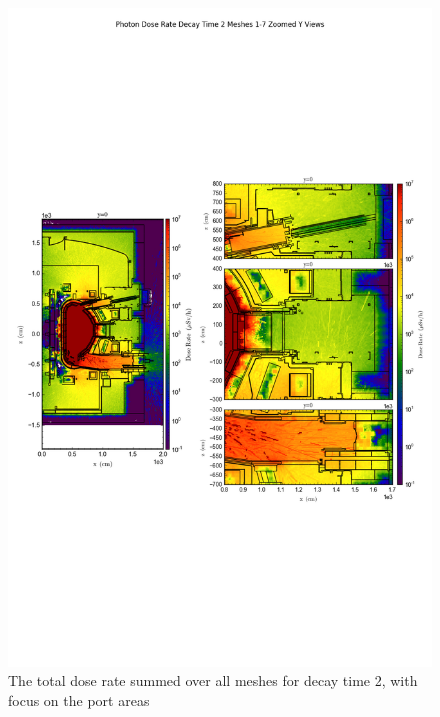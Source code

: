 \documentclass[12pt]{article}
\begin{document}
\begin{figure}[ht!]
\centering
\includegraphics[trim={0cm 9cm 0cm 10cm},clip,scale=0.75]{../plots/final_model/Photon_Dose_Rate_Decay_Time_2_Meshes_1-7_Zoomed_Y_Views.png}
\caption{The total dose rate summed over all meshes for decay time 2, with focus on the port areas}
\label{fig:photons_dc2_no4bc_total_zoomed}
\end{figure}
\end{document}
